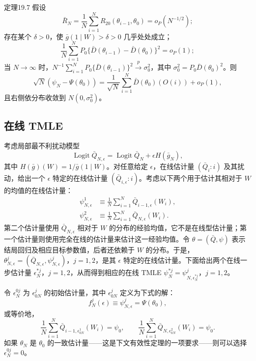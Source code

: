\begin{bookresult}{定理}{19.7}
假设
\[
 \bar R_N=\frac1N\sum_{i=1}^N R_{20}(\theta_{i-1},\theta_0)=o_P(N^{-1/2});
\]
存在某个 $\delta>0$，使 $\bar g(1\mid W)>\delta>0$ 几乎处处成立；
\[
 \frac1N\sum_{i=1}^N P_0\{\bar D(\theta_{i-1})-\bar D(\theta_0)\}^2=o_P(1);
\]
当 $N\to\infty$ 时，$N^{-1}\sum_{i=1}^N P_0\{\bar D(\theta_{i-1})\}^2\xrightarrow{p}\sigma_0^2$，其中 $\sigma_0^2=P_0\bar D(\theta_0)^2$。则
\[
 \sqrt N(\psi_N-\Psi(\theta_0))
 =\frac1{\sqrt N}\sum_{i=1}^N\bar D(\theta_0)(O(i))+o_P(1),
\]
且右侧依分布收敛到 $N(0,\sigma_0^2)$。
\end{bookresult}

\subsection{在线 TMLE}

考虑局部最不利扰动模型
\[
 \operatorname{Logit}\bar Q_{N,\epsilon}
 =\operatorname{Logit}\bar Q_N+\epsilon H(\bar g_N),
\]
其中 $H(\bar g)(W)=1/\bar g(1\mid W)$。对任意给定 $\epsilon$，在线估计量 $(\bar Q_i:i)$ 及其扰动，给出一个 $\epsilon$ 特定的在线估计量 $(\bar Q_{i,\epsilon}:i)$。考虑以下两个用于估计其相对于 $W$ 的均值的在线估计量：
\[
\begin{aligned}
 \psi_{N,\epsilon}^1&\equiv\frac1N\sum_{i=1}^N\bar Q_{i-1,\epsilon}(W_i),\\
 \psi_{N,\epsilon}^2&\equiv\frac1N\sum_{i=1}^N\bar Q_{N,\epsilon}(W_i).
\end{aligned}
\]
第二个估计量使用 $\bar Q_{N,\epsilon}$ 相对于 $W$ 的分布的经验均值，它不是在线型估计量；第一个估计量则使用完全在线的估计量来估计这一经验均值。令 $\theta=(\bar Q,\psi)$ 表示结局回归及相应目标参数值，后者还依赖于 $W$ 的分布。于是，$\theta_{N,\epsilon}^j=(\bar Q_{N,\epsilon},\psi_{N,\epsilon}^j)$，$j=1,2$，是其 $\epsilon$ 特定的在线估计量。下面给出两个在线一步估计量 $\epsilon_N^{*j}$，$j=1,2$，从而得到相应的在线 TMLE $\psi_N^{*j}=\psi_{N,\epsilon_N^{*j}}^j$，$j=1,2$。

令 $\epsilon_N^{0j}$ 为 $\epsilon_{0N}^j$ 的初始估计量，其中 $\epsilon_{0N}^j$ 定义为下式的解：
\[
 f_N^j(\epsilon)\equiv\psi_{N,\epsilon}^j=\Psi(\theta_0),
\]
或等价地，
\[
 \frac1N\sum_{i=1}^N\bar Q_{i-1,\epsilon_{0N}^1}(W_i)=\psi_0,
 \qquad\frac1N\sum_{i=1}^N\bar Q_{N,\epsilon_{0N}^2}(W_i)=\psi_0.
\]
如果 $\theta_N$ 是 $\theta_0$ 的一致估计量——这是下文有效性定理的一项要求——则可以选择 $\epsilon_N^{0j}=0$。

